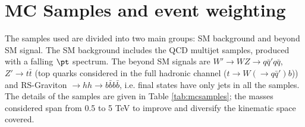 
\section{MC Samples and event weighting}
The samples used are divided into two main groups: SM background and beyond SM signal. The SM background includes the QCD multijet samples, produced with a falling $\pt$ spectrum. The beyond SM signals are $W'\to WZ\to q\bar{q}'q\bar{q}$, $Z'\to t\bar{t}$ (top quarks considered in the full hadronic channel ($t\to W(\to q\bar{q}')b$)) and RS-Graviton $\to hh \to b\bar{b}b\bar{b}$, i.e. final states have only jets in all the samples. The details of the samples are given in Table \ref{tab:mcsamples}; the masses considered span from 0.5 to 5 TeV to improve and diversify the kinematic space covered.


